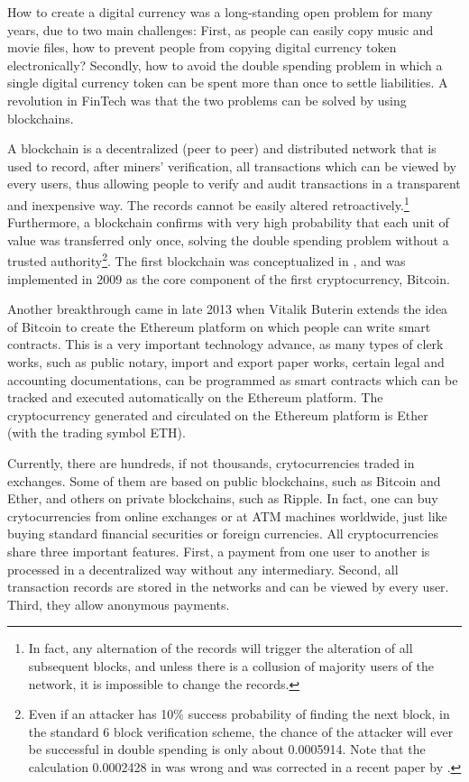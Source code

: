 \documentclass[draft, noinfoline]{ectaart}
\numberwithin{equation}{section}
\theoremstyle{plain}
\begin{document}
How to create a digital currency was a long-standing open problem for many years, due to two main challenges: First, as people can easily copy music and movie files, how to prevent people from copying digital currency token electronically? Secondly, how to avoid the double spending problem in which a single digital currency token can be spent more than once to settle liabilities. A revolution in FinTech was that the two problems can be solved by using blockchains.

A blockchain is a decentralized (peer to peer) and distributed network that is used to record, after miners' verification, all transactions which can be viewed by every users, thus allowing people to verify and audit transactions in a transparent and inexpensive way. The records cannot be easily altered retroactively.\footnote{In fact, any alternation of the records will trigger the alteration of all subsequent blocks, and unless there is a collusion of majority users of the network, it is impossible to change the records.} Furthermore, a blockchain confirms with very high probability that each unit of value was transferred only once, solving the  double spending problem without a trusted authority\footnote{Even if an attacker has 10\% success probability of finding the next block, in the standard 6 block verification scheme, the chance of the attacker will ever be successful in double spending is only about 0.0005914. Note that the calculation 0.0002428 in \cite{nakamoto_bitcoin:_2008} was wrong and was corrected in a recent paper by \cite{Grunspan_2018}.}. The first blockchain was conceptualized in \cite{nakamoto_bitcoin:_2008}, and was implemented in 2009 as the core component of the first cryptocurrency, Bitcoin.

Another breakthrough came in late 2013 when Vitalik Buterin extends the idea of Bitcoin to create the Ethereum platform on which people can write smart contracts. This is a very important technology advance, as many types of clerk works, such as public notary, import and export paper works, certain legal and accounting documentations, can be
programmed as smart contracts which can be tracked and executed automatically on the Ethereum platform. The cryptocurrency generated and circulated on the Ethereum platform is Ether (with the trading symbol ETH).

Currently, there are hundreds, if not thousands, crytocurrencies traded in exchanges. Some of them are based on public blockchains, such as Bitcoin and Ether, and others on private blockchains, such as Ripple. In fact, one can buy crytocurrencies from online exchanges or at ATM machines worldwide, just like buying standard financial securities or foreign currencies.  All cryptocurrencies share three important features. First, a payment from one user to another is processed in a decentralized way without any intermediary. Second, all transaction records are stored in the networks and can be viewed by every user. Third, they allow anonymous payments.
\end{document}
